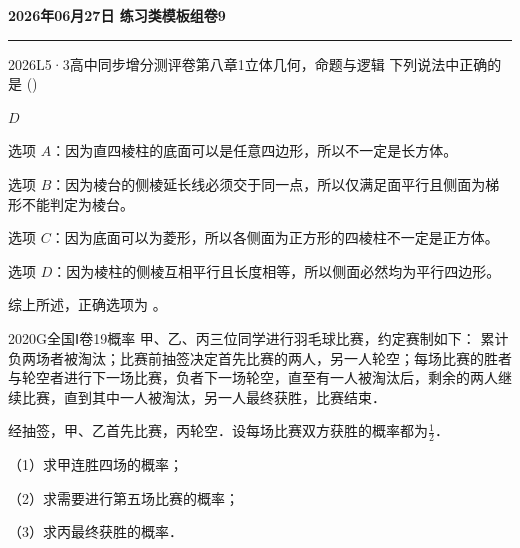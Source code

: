 \documentclass[12pt,UTF-8,a4paper]{ctexart}
\newcommand{\mytitle}{}
\numberwithin{figure}{section}
\theoremstyle{mystyle}
\theoremstyle{mystylekaishu}
\theoremstyle{mystyle}
\numberwithin{xiti}{section}
\begin{document}
\thispagestyle{plain} %
\renewcommand{\mytitle}{2026年06月27日 练习类模板组卷9}

\begin{center}
  {\Huge\bfseries\color{structure} \mytitle}
  \vspace{0.5em}
  
  \textcolor{structure}{\rule{\linewidth}{1.5pt}}
\end{center}
\vspace{1em}


\begin{problem}{2026}{L}{5·3高中同步增分测评卷第八章}{1}{立体几何，命题与逻辑}
下列说法中正确的是 (\hspace{1cm})
\begin{choices}
\end{choices}
\end{problem}

\begin{answer}
$D$
\end{answer}

\begin{solutions}
选项 $A$：因为直四棱柱的底面可以是任意四边形，所以不一定是长方体。

选项 $B$：因为棱台的侧棱延长线必须交于同一点，所以仅满足面平行且侧面为梯形不能判定为棱台。

选项 $C$：因为底面可以为菱形，所以各侧面为正方形的四棱柱不一定是正方体。

选项 $D$：因为棱柱的侧棱互相平行且长度相等，所以侧面必然均为平行四边形。

综上所述，正确选项为 。
\end{solutions}


\begin{problem}{2020}{G}{全国Ⅰ卷}{19}{概率}
甲、乙、丙三位同学进行羽毛球比赛，约定赛制如下：  
累计负两场者被淘汰；比赛前抽签决定首先比赛的两人，另一人轮空；每场比赛的胜者与轮空者进行下一场比赛，负者下一场轮空，直至有一人被淘汰后，剩余的两人继续比赛，直到其中一人被淘汰，另一人最终获胜，比赛结束．  

经抽签，甲、乙首先比赛，丙轮空．设每场比赛双方获胜的概率都为$\frac{1}{2}$．  

（1）求甲连胜四场的概率；  

（2）求需要进行第五场比赛的概率；  

（3）求丙最终获胜的概率．
\end{problem}
\end{document}
